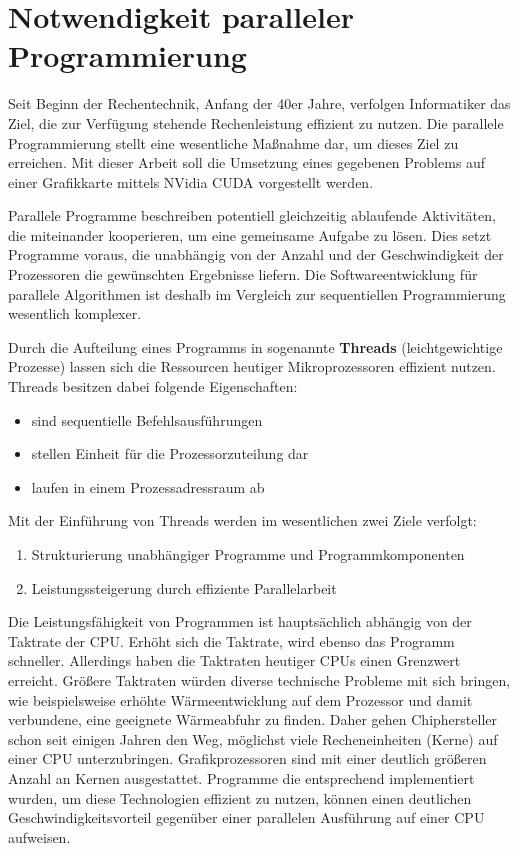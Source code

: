 
\chapter{Notwendigkeit paralleler Programmierung}
\label{intro}
Seit Beginn der Rechentechnik, Anfang der 40er Jahre, verfolgen Informatiker das Ziel, die zur Verfügung stehende Rechenleistung effizient zu nutzen.
Die parallele Programmierung stellt eine wesentliche Maßnahme dar, um dieses Ziel zu erreichen. Mit dieser Arbeit soll die Umsetzung eines gegebenen Problems auf einer Grafikkarte mittels NVidia CUDA vorgestellt werden.

Parallele Programme beschreiben potentiell gleichzeitig ablaufende Aktivitäten, die miteinander kooperieren, um eine gemeinsame Aufgabe zu lösen. Dies setzt Programme voraus, die unabhängig von der Anzahl und der Geschwindigkeit der Prozessoren die gewünschten Ergebnisse liefern. Die Softwareentwicklung für parallele Algorithmen ist deshalb im Vergleich zur sequentiellen Programmierung wesentlich komplexer.

Durch die Aufteilung eines Programms in sogenannte \textbf{Threads} (\glqq leichtgewichtige Prozesse\grqq) lassen sich die Ressourcen heutiger Mikroprozessoren effizient nutzen.
Threads besitzen dabei folgende Eigenschaften:
\begin{itemize}
\item sind sequentielle Befehlsausführungen
\item stellen Einheit für die Prozessorzuteilung dar
\item laufen in einem Prozessadressraum ab
\end{itemize}
Mit der Einführung von Threads werden im wesentlichen zwei Ziele verfolgt:
\begin{enumerate}
\item Strukturierung unabhängiger Programme und Programmkomponenten
\item Leistungssteigerung durch effiziente Parallelarbeit
\end{enumerate}

Die Leistungsfähigkeit von Programmen ist hauptsächlich abhängig von der Taktrate der CPU. Erhöht sich die Taktrate, wird ebenso das Programm schneller.
Allerdings haben die Taktraten heutiger CPUs einen Grenzwert erreicht.
Größere Taktraten würden diverse technische Probleme mit sich bringen, wie beispielsweise erhöhte Wärmeentwicklung auf dem Prozessor und damit verbundene, eine geeignete Wärmeabfuhr zu finden.
Daher gehen Chiphersteller schon seit einigen Jahren den Weg, möglichst viele Recheneinheiten (Kerne) auf einer CPU unterzubringen. Grafikprozessoren sind mit einer deutlich größeren Anzahl an Kernen ausgestattet.
Programme die entsprechend implementiert wurden, um diese Technologien effizient zu nutzen, können einen deutlichen Geschwindigkeitsvorteil gegenüber einer parallelen Ausführung auf einer CPU aufweisen.


